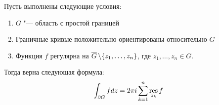 \begin{theorem}
	Пусть выполнены следующие условия:
	\begin{enumerate}
		\item $G$ "--- область с простой границей
		
		\item Граничные кривые положительно ориентированы относительно $G$
		
		\item Функция $f$ регулярна на $\overline{G}\,\backslash \{z_1, \dotsc, z_n\}$, где $z_1, \dotsc, z_n \in G$.
	\end{enumerate}
	
	Тогда верна следующая формула:
	\[\int_{\partial G}fdz = 2\pi i\sum_{k = 1}^n\operatorname*{res}_{z_k}f\]
\end{theorem}

